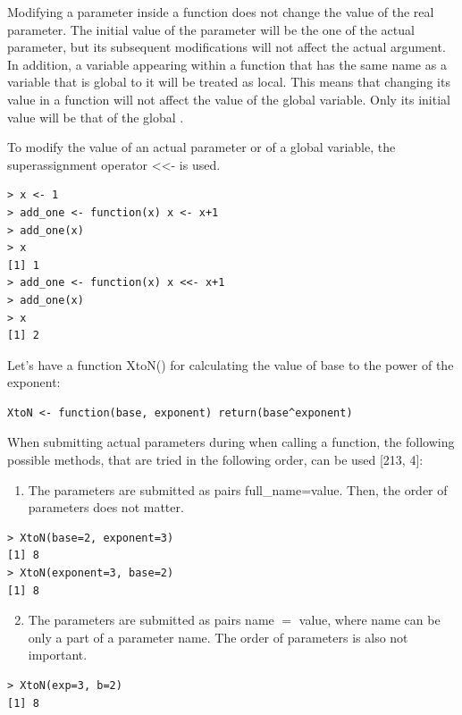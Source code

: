 \documentclass[11pt,openany,executivepaper]{book}
\begin{document}
Modifying a parameter inside a function does not change the value of the real parameter. The initial value of the parameter will be the one of the actual parameter, but its subsequent modifications will not affect the actual argument. In addition, a variable appearing within a function that has the same name as a variable that is global to it will be treated as local. This means that changing its value in a function will not affect the value of the global variable. Only its initial value will be that of the global \cite{183}.

To modify the value of an actual parameter or of a global variable, the superassignment operator <<- is used.

\begin{verbatim}
> x <- 1
> add_one <- function(x) x <- x+1
> add_one(x)
> x
[1] 1
> add_one <- function(x) x <<- x+1
> add_one(x)
> x
[1] 2
\end{verbatim}

Let's have a function XtoN() for calculating the value of base to the power of the exponent:

\begin{verbatim}
XtoN <- function(base, exponent) return(base^exponent)
\end{verbatim}

When submitting actual parameters during when calling a function, the following possible methods, that are tried in the following order, can be used [213, 4]:

\begin{enumerate}
  \item The parameters are submitted as pairs full\_name=value. Then, the order of parameters does not matter.
\end{enumerate}

\begin{verbatim}
> XtoN(base=2, exponent=3)
[1] 8
> XtoN(exponent=3, base=2)
[1] 8
\end{verbatim}

\begin{enumerate}
  \setcounter{enumi}{1}
  \item The parameters are submitted as pairs name $=$ value, where name can be only a part of a parameter name. The order of parameters is also not important.
\end{enumerate}

\begin{verbatim}
> XtoN(exp=3, b=2)
[1] 8
\end{verbatim}
\end{document}
